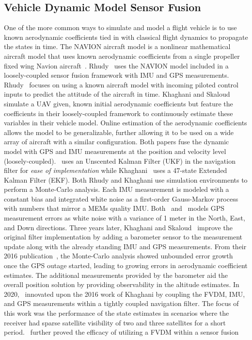 \subsection{\textbf{Vehicle Dynamic Model Sensor Fusion}}
One of the more common ways to simulate and model a flight vehicle is to use known aerodynamic coefficients tied in with classical flight dynamics to propagate the states in time. The NAVION aircraft model is a nonlinear mathematical aircraft model that uses known aerodynamic coefficients from a single propeller fixed wing Navion aircraft~\cite{nelsonFlightStabilityAutomatic1998}. Rhudy~\cite{rhudyDynamicModelaidedSensor2017} uses the NAVION model included in a loosely-coupled sensor fusion framework with IMU and GPS measurements. Rhudy~\cite{rhudyDynamicModelaidedSensor2017} focuses on using a known aircraft model with incoming piloted control inputs to predict the attitude of the aircraft in time. Khaghani and Skaloud~\cite{khaghaniAutonomousVehicleDynamic2016} simulate a UAV given, known initial aerodynamic coefficients but feature the coefficients in their loosely-coupled framework to continuously estimate these variables in their vehicle model. Online estimation of the aerodynamic coefficients allows the model to be generalizable, further allowing it to be used on a wide array of aircraft with a similar configuration. Both papers fuse the dynamic model with GPS and IMU measurements at the position and velocity level (loosely-coupled).~\cite{rhudyDynamicModelaidedSensor2017} uses an Unscented Kalman Filter (UKF) in the navigation filter for \textit{ease of implementation} while Khaghani~\cite{khaghaniAutonomousVehicleDynamic2016,khaghaniAssessmentVDMbasedAutonomous2018} uses a 47-state Extended Kalman Filter (EKF). Both Rhudy and Khaghani use simulation environments to perform a Monte-Carlo analysis. Each IMU measurement is modeled with a constant bias and integrated white noise as a first-order Gauss-Markov process with numbers that mirror a MEMs quality IMU\@. Both~\cite{khaghaniAutonomousVehicleDynamic2016} and~\cite{rhudyDynamicModelaidedSensor2017} models GPS measurement errors as white noise with a variance of 1 meter in the North, East, and Down directions. Three years later, Khaghani and Skaloud~\cite{khaghaniAssessmentVDMbasedAutonomous2018} improve the original filter implementation by adding a barometer sensor to the measurement update along with the already standing IMU and GPS measurements. From their 2016 publication~\cite{khaghaniAutonomousVehicleDynamic2016}, the Monte-Carlo analysis showed unbounded error growth once the GPS outage started, leading to growing errors in aerodynamic coefficient estimates. The additional measurements provided by the barometer aid the overall position solution by providing observability in the altitude estimates. In 2020,~\cite{mwenegohaModelbasedTightlyCoupled2020} innovated upon the 2016 work of Khaghani by coupling the FVDM, IMU, and GPS measurements within a tightly coupled navigation filter. The focus of this work was the performance of the state estimates in scenarios where the receiver had sparse satellite visibility of two and three satellites for a short period.~\cite{mwenegohaModelbasedTightlyCoupled2020} further proved the efficacy of utilizing a FVDM within a sensor fusion 